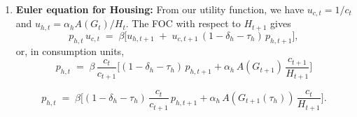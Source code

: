 \begin{enumerate}
    \begin{equation}
        \kappa\bigl(1+\phi(G_t)\bigr)^{1+\theta}n_t^{\theta} = \frac{(1-\tau_L)w_t}{c_t};\label{eq:labor}
    \end{equation}

    \begin{equation}
            n_t \;=\;\Biggl[\,
            \frac{(1-\tau_L)\,w_t}
                {\kappa\,c_t\,\bigl(1+\phi(G_t)\bigr)^{1+\theta}}
            \Biggr]^{\!1/\theta}\!
    \end{equation}

    Intuitively, the marginal rate of substitution between leisure (or time) and consumption equals the real after-tax wage. 
    An increase in commuting factor $\phi(G_t)$ (worse roads) raises the left-hand side (effective disutility of labor), leading the household to supply less labor for a given wage. This aligns with the idea that poor road quality reduces effective labor supply as households require higher compensation to work the same hours because commuting erodes their usable time.

  \item \textbf{Euler equation for Housing:}
  From our utility function, we have $u_{c,t}=1/c_t$ and $u_{h,t}=\alpha_h A(G_t)/H_t$. The FOC with respect to $H_{t+1}$ gives
  \begin{equation}
  p_{h,t}\,u_{c,t}
  \;=\; \beta\Big[u_{h,t+1} \;+\; u_{c,t+1}\,(1-\delta_h-\tau_h)\,p_{h,t+1}\Big],
  \label{eq:euler_H_util}
  \end{equation}
  or, in consumption units,
  \begin{equation}
    p_{h,t}
    \;=\; \beta\,\frac{c_t}{c_{t+1}}
    \Big[
    (1-\delta_h-\tau_h)\,p_{h,t+1}
    + \alpha_h\,A(G_{t+1})\,\frac{c_{t+1}}{H_{t+1}}
    \Big]
    \label{eq:euler_H_cons}
  \end{equation}

  \begin{equation}
    p_{h,t}
    \;=\;
    \beta\Big[
    (1-\delta_h-\tau_h)\,\frac{c_t}{c_{t+1}}\,p_{h,t+1}
    + \alpha_h\,A(G_{t+1}(\tau_h))\,\frac{c_t}{H_{t+1}}
    \Big].
  \label{eq:euler_H_cons2}
  \end{equation}


\end{enumerate}
